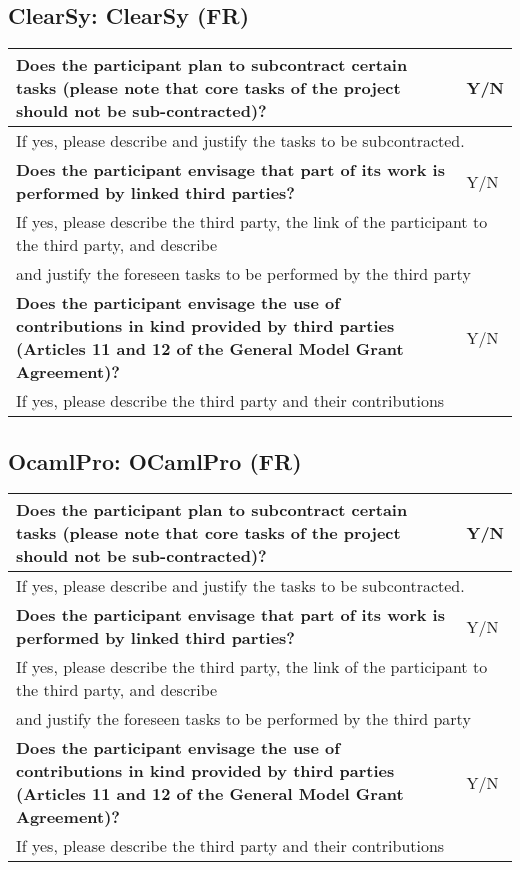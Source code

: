 \subsection{ClearSy: ClearSy (FR)}

\begin{longtable}{|p{}|p{}|}
\hline
{\bf Does the participant plan to subcontract certain tasks (please
  note that core tasks of the project should not be sub-contracted)?}
&
Y/N
\\
\hline
\multicolumn{2}{|l|}{
If yes, please describe and justify the tasks to be subcontracted.}
\\
\hline
{\bf Does the participant envisage that  part of its work is performed
  by linked third parties?}
&
Y/N
\\
\hline
\multicolumn{2}{|l|}{If yes, please describe the third party, the link of the
  participant to the third party, and describe}\\
\multicolumn{2}{|l|}{and justify the foreseen
tasks to be performed by the third party}
\\
\hline
{\bf Does the participant envisage the use of contributions in kind
provided by third parties (Articles 11 and 12 of the General Model
Grant Agreement)?}
&
Y/N
\\
\hline
\multicolumn{2}{|l|}{If yes, please describe the third party and their contributions}
\\
\hline
\end{longtable}


\subsection{OcamlPro: OCamlPro (FR)}

\begin{longtable}{|p{}|p{}|}
\hline
{\bf Does the participant plan to subcontract certain tasks (please
  note that core tasks of the project should not be sub-contracted)?}
&
Y/N
\\
\hline
\multicolumn{2}{|l|}{
If yes, please describe and justify the tasks to be subcontracted.}
\\
\hline
{\bf Does the participant envisage that  part of its work is performed
  by linked third parties?}
&
Y/N
\\
\hline
\multicolumn{2}{|l|}{If yes, please describe the third party, the link of the
  participant to the third party, and describe}\\
\multicolumn{2}{|l|}{and justify the foreseen
tasks to be performed by the third party}
\\
\hline
{\bf Does the participant envisage the use of contributions in kind
provided by third parties (Articles 11 and 12 of the General Model
Grant Agreement)?}
&
Y/N
\\
\hline
\multicolumn{2}{|l|}{If yes, please describe the third party and their contributions}
\\
\hline
\end{longtable}


